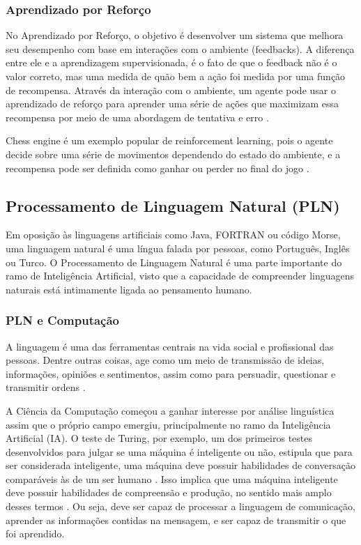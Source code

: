 \documentclass[
	12pt,				%
	openright,			%
	oneside,			%
	a4paper,			%
	english,			%
	spanish,			%
	brazil				%
	]{abntex2}
\begin{document}
	\subsubsection*{Aprendizado por Reforço}
		No Aprendizado por Reforço, o objetivo é desenvolver um sistema que melhora seu desempenho com base em interações com o ambiente (feedbacks). A diferença entre ele e a aprendizagem supervisionada, é o fato de que o feedback não é o valor correto, mas uma medida de quão bem a ação foi medida por uma função de recompensa. Através da interação com o ambiente, um agente pode usar o aprendizado de reforço para aprender uma série de ações que maximizam essa recompensa por meio de uma abordagem de tentativa e erro \cite{ r_julian_heart}.

		Chess engine é um exemplo popular de reinforcement learning, pois o agente decide sobre uma série de movimentos dependendo do estado do ambiente, e a recompensa pode ser definida como ganhar ou perder no final do jogo \cite{r_julian_heart}.
	 

	\subsection{Processamento de Linguagem Natural (PLN)}
	Em oposição às linguagens artificiais como Java, FORTRAN ou código Morse, uma linguagem natural é uma língua falada por pessoas, como Português, Inglês ou Turco. O Processamento de Linguagem Natural é uma parte importante do ramo de Inteligência Artificial, visto que a capacidade de compreender linguagens naturais está intimamente ligada ao pensamento humano. %
	
		\subsubsection*{PLN e Computação}
		A linguagem é uma das ferramentas centrais na vida social e profissional das pessoas. Dentre outras coisas, age como um meio de transmissão de ideias, informações, opiniões e sentimentos, assim como para persuadir, questionar e transmitir ordens \cite{book_natural_lang}.
		
	A Ciência da Computação começou a ganhar interesse por análise linguística assim que o próprio campo emergiu, principalmente no ramo da Inteligência Artificial (IA). O teste de Turing, por exemplo, um dos primeiros testes desenvolvidos para julgar se uma máquina é inteligente ou não, estipula que para ser considerada inteligente, uma máquina deve possuir habilidades de conversação comparáveis às de um ser humano \cite{turing}. Isso implica que uma máquina inteligente deve possuir habilidades de compreensão e produção, no sentido mais amplo desses termos \cite{book_natural_lang}. Ou seja, deve ser capaz de processar a linguagem de comunicação, aprender as informações contidas na mensagem, e ser capaz de transmitir o que foi aprendido. 	
	
\end{document}
